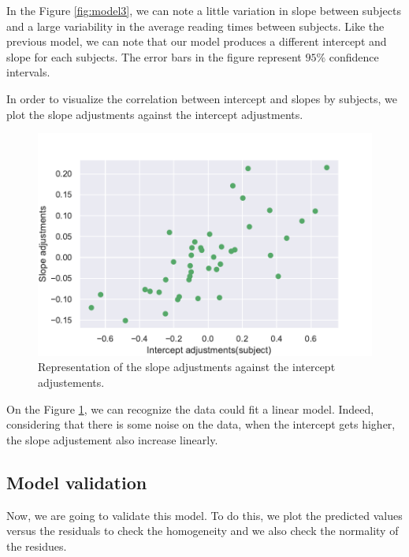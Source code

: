 \documentclass{article}
\begin{document}
In the Figure \ref{fig:model3}, we can note a little variation in slope between subjects and  a large variability in the average reading times between subjects. Like the previous model, we can note that our model produces a different intercept and slope for each subjects. The error bars in the figure represent $95\%$ confidence intervals.


In order to visualize the correlation between intercept and slopes by subjects, we plot the slope adjustments against the intercept adjustments.
\begin{figure}[H]
    \centering
    \includegraphics[scale=.65]{./images/adj_so_inter.pdf}
    \caption{Representation of the slope adjustments against the intercept adjustements.}
    \label{fig:adj_slope}
\end{figure}

On the Figure \ref{fig:adj_slope}, we can recognize the data could fit a linear model. Indeed, considering that there is some noise on the data, when the intercept gets higher, the slope adjustement also increase linearly. 

\subsection{Model validation}
Now, we are going to validate this model. To do this, we plot the predicted values versus the residuals to check the homogeneity and we also check the normality of the residues.
\end{document}
